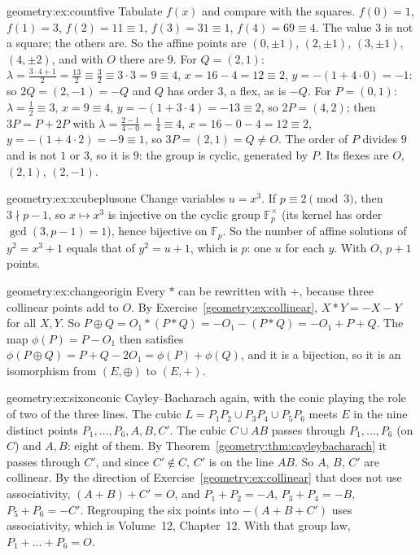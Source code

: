 \begin{solution}{geometry:ex:countfive}
\idea Tabulate $f(x)$ and compare with the squares.
\writeup $f(0)=1$, $f(1)=3$, $f(2)=11\equiv1$, $f(3)=31\equiv1$, $f(4)=69\equiv4$. The value $3$ is not a square; the others are. So the affine points are
$(0,\pm1)$, $(2,\pm1)$, $(3,\pm1)$, $(4,\pm2)$, and with $O$ there are $9$. For $Q=(2,1)$: $\lambda=\frac{3\cdot4+1}{2}=\frac{13}2\equiv\frac32\equiv3\cdot3=9\equiv4$,
$x=16-4=12\equiv2$, $y=-(1+4\cdot0)=-1$: so $2Q=(2,-1)=-Q$ and $Q$ has order $3$, a flex, as is $-Q$. For $P=(0,1)$: $\lambda=\frac{1}{2}\equiv3$, $x=9\equiv4$,
$y=-(1+3\cdot4)=-13\equiv2$, so $2P=(4,2)$; then $3P=P+2P$ with $\lambda=\frac{2-1}{4-0}=\frac14\equiv4$, $x=16-0-4=12\equiv2$, $y=-(1+4\cdot2)=-9\equiv1$, so
$3P=(2,1)=Q\ne O$. The order of $P$ divides $9$ and is not $1$ or $3$, so it is $9$: the group is cyclic, generated by $P$. Its flexes are $O$, $(2,1)$, $(2,-1)$.
\end{solution}

\begin{solution}{geometry:ex:xcubeplusone}
\idea Change variables $u=x^3$.
\writeup If $p\equiv2\pmod3$, then $3\nmid p-1$, so $x\mapsto x^3$ is injective on the cyclic group $\mathbb F_p^\times$ (its kernel has order $\gcd(3,p-1)=1$), hence
bijective on $\mathbb F_p$. So the number of affine solutions of $y^2=x^3+1$ equals that of $y^2=u+1$, which is $p$: one $u$ for each $y$. With $O$, $p+1$ points.
\end{solution}

\begin{solution}{geometry:ex:changeorigin}
\idea Every $*$ can be rewritten with $+$, because three collinear points add to $O$.
\writeup By Exercise~\ref{geometry:ex:collinear}, $X*Y=-X-Y$ for all $X,Y$. So $P\oplus Q=O_1*(P*Q)=-O_1-(P*Q)=-O_1+P+Q$. The map $\phi(P)=P-O_1$ then satisfies
$\phi(P\oplus Q)=P+Q-2O_1=\phi(P)+\phi(Q)$, and it is a bijection, so it is an isomorphism from $(E,\oplus)$ to $(E,+)$.
\end{solution}

\begin{solution}{geometry:ex:sixonconic}
\idea Cayley--Bacharach again, with the conic playing the role of two of the three lines.
\writeup The cubic $L=P_1P_2\cup P_3P_4\cup P_5P_6$ meets $E$ in the nine distinct points $P_1,\dots,P_6,A,B,C'$. The cubic $C\cup AB$ passes through
$P_1,\dots,P_6$ (on $C$) and $A,B$: eight of them. By Theorem~\ref{geometry:thm:cayleybacharach} it passes through $C'$, and since $C'\notin C$, $C'$ is on the line $AB$.
So $A$, $B$, $C'$ are collinear. By the direction of Exercise~\ref{geometry:ex:collinear} that does not use associativity, $(A+B)+C'=O$, and $P_1+P_2=-A$, $P_3+P_4=-B$, $P_5+P_6=-C'$. Regrouping the six points into $-(A+B+C')$ uses associativity, which is Volume~12, Chapter~12. With that group law, $P_1+\dots+P_6=O$.
\end{solution}

